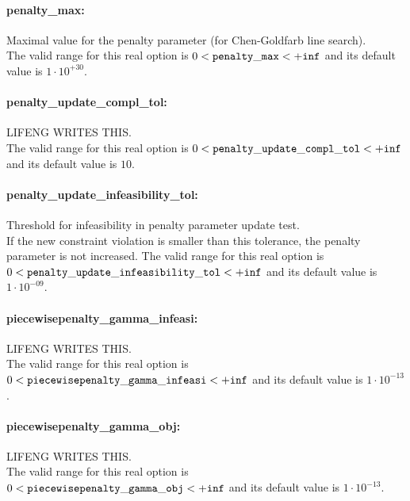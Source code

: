 \paragraph{penalty\_max:}\label{opt:penalty_max} Maximal value for the penalty parameter (for Chen-Goldfarb line search). \\
 The valid range for this real option is 
$0 <  {\tt penalty\_max } <  {\tt +inf}$
and its default value is $1 \cdot 10^{+30}$.


\paragraph{penalty\_update\_compl\_tol:}\label{opt:penalty_update_compl_tol} LIFENG WRITES THIS. \\
 The valid range for this real option is 
$0 <  {\tt penalty\_update\_compl\_tol } <  {\tt +inf}$
and its default value is $10$.


\paragraph{penalty\_update\_infeasibility\_tol:}\label{opt:penalty_update_infeasibility_tol} Threshold for infeasibility in penalty parameter update test. \\
 If the new constraint violation is smaller than this tolerance, the penalty parameter is not increased. The valid range for this real option is 
$0 <  {\tt penalty\_update\_infeasibility\_tol } <  {\tt +inf}$
and its default value is $1 \cdot 10^{-09}$.


\paragraph{piecewisepenalty\_gamma\_infeasi:}\label{opt:piecewisepenalty_gamma_infeasi} LIFENG WRITES THIS. \\
 The valid range for this real option is 
$0 <  {\tt piecewisepenalty\_gamma\_infeasi } <  {\tt +inf}$
and its default value is $1 \cdot 10^{-13}$.


\paragraph{piecewisepenalty\_gamma\_obj:}\label{opt:piecewisepenalty_gamma_obj} LIFENG WRITES THIS. \\
 The valid range for this real option is 
$0 <  {\tt piecewisepenalty\_gamma\_obj } <  {\tt +inf}$
and its default value is $1 \cdot 10^{-13}$.


